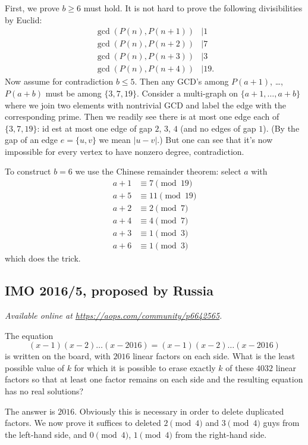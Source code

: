 \documentclass[11pt]{scrartcl}
\begin{document}
First, we prove $b \ge 6$ must hold.
It is not hard to prove the following divisibilities by Euclid:
\begin{align*}
 \gcd(P(n), P(n+1)) &\mid 1 \\
 \gcd(P(n), P(n+2)) &\mid 7 \\
 \gcd(P(n), P(n+3)) &\mid 3 \\
 \gcd(P(n), P(n+4)) &\mid 19.
\end{align*}
Now assume for contradiction $b \le 5$.
Then any GCD's among $P(a+1)$, \dots, $P(a+b)$ must be among $\{3, 7, 19\}$.
Consider a multi-graph on $\{a+1, \dots, a+b\}$ where we join two elements with nontrivial GCD
and label the edge with the corresponding prime.
Then we readily see there is at most one edge each of $\{3, 7, 19\}$:
id est at most one edge of gap $2$, $3$, $4$ (and no edges of gap $1$).
(By the gap of an edge $e = \{u,v\}$ we mean $|u - v|$.)
But one can see that it's now impossible for every vertex to have nonzero degree, contradiction.

To construct $b = 6$ we use the Chinese remainder theorem: select $a$ with
\begin{align*}
 a+1 & \equiv 7 \pmod{19} \\
 a+5 & \equiv 11 \pmod{19} \\
 a+2 & \equiv 2 \pmod{7} \\
 a+4 & \equiv 4 \pmod{7} \\
 a+3 & \equiv 1 \pmod{3} \\
 a+6 & \equiv 1 \pmod{3}
\end{align*}
which does the trick.
\pagebreak

\subsection{IMO 2016/5, proposed by Russia}
\textsl{Available online at \url{https://aops.com/community/p6642565}.}
\begin{mdframed}[style=mdpurplebox,frametitle={Problem statement}]
The equation
\[ (x-1)(x-2)\dots(x-2016)=(x-1)(x-2)\dots (x-2016) \]
is written on the board, with $2016$ linear factors on each side.
What is the least possible value of $k$ for which it is possible to
erase exactly $k$ of these $4032$ linear factors so that at least
one factor remains on each side and the resulting equation
has no real solutions?
\end{mdframed}
The answer is $2016$.
Obviously this is necessary in order to delete duplicated factors.
We now prove it suffices to deleted $2 \pmod 4$ and $3 \pmod 4$
guys from the left-hand side, and $0 \pmod 4$,
$1 \pmod 4$ from the right-hand side.
\end{document}
